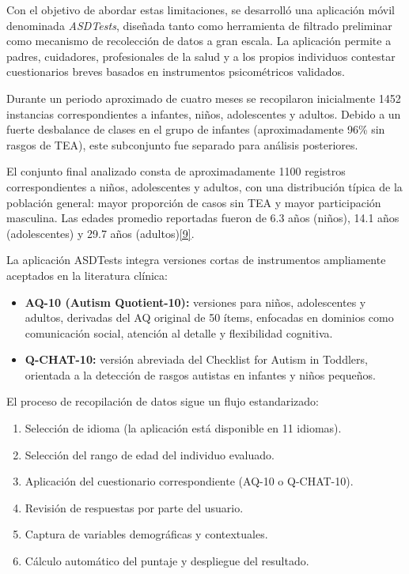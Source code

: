 Con el objetivo de abordar estas limitaciones, se desarrolló una aplicación móvil denominada \textit{ASDTests}, diseñada tanto como herramienta de filtrado preliminar como mecanismo de recolección de datos a gran escala. La aplicación permite a padres, cuidadores, profesionales de la salud y a los propios individuos contestar cuestionarios breves basados en instrumentos psicométricos validados.

Durante un periodo aproximado de cuatro meses se recopilaron inicialmente 1452 instancias correspondientes a infantes, niños, adolescentes y adultos. Debido a un fuerte desbalance de clases en el grupo de infantes (aproximadamente 96\% sin rasgos de TEA), este subconjunto fue separado para análisis posteriores.

El conjunto final analizado consta de aproximadamente 1100 registros correspondientes a niños, adolescentes y adultos, con una distribución típica de la población general: mayor proporción de casos sin TEA y mayor participación masculina. Las edades promedio reportadas fueron de 6.3 años (niños), 14.1 años (adolescentes) y 29.7 años (adultos)\hyperlink{9}{[9]}.

La aplicación ASDTests integra versiones cortas de instrumentos ampliamente aceptados en la literatura clínica:

\begin{itemize} \item \textbf{AQ-10 (Autism Quotient-10):} versiones para niños, adolescentes y adultos, derivadas del AQ original de 50 ítems, enfocadas en dominios como comunicación social, atención al detalle y flexibilidad cognitiva. \item \textbf{Q-CHAT-10:} versión abreviada del Checklist for Autism in Toddlers, orientada a la detección de rasgos autistas en infantes y niños pequeños. \end{itemize}

El proceso de recopilación de datos sigue un flujo estandarizado:

\begin{enumerate} \item Selección de idioma (la aplicación está disponible en 11 idiomas). \item Selección del rango de edad del individuo evaluado. \item Aplicación del cuestionario correspondiente (AQ-10 o Q-CHAT-10). \item Revisión de respuestas por parte del usuario. \item Captura de variables demográficas y contextuales. \item Cálculo automático del puntaje y despliegue del resultado. \end{enumerate}

